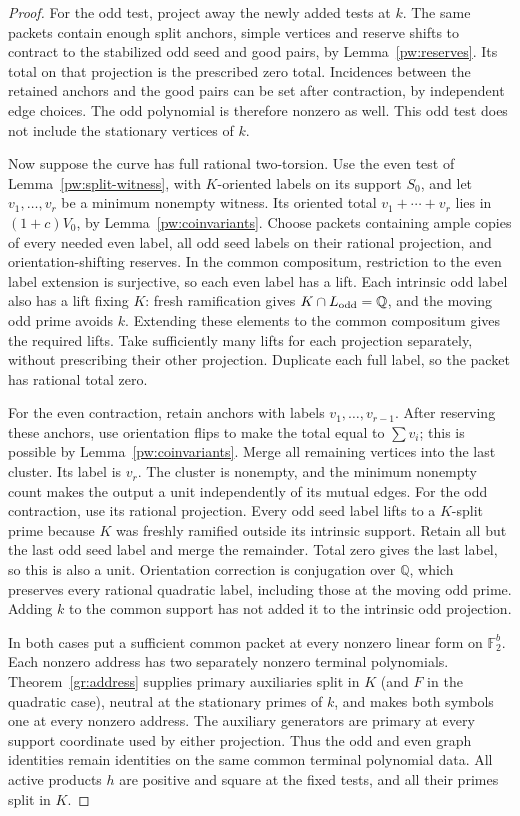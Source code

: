 \begin{proof}
For the odd test, project away the newly added tests at $k$.  The same
packets contain enough split anchors, simple vertices and reserve shifts
to contract to the stabilized odd seed and good pairs, by
Lemma~\ref{pw:reserves}.  Its total on that projection is the prescribed
zero total.  Incidences between the retained anchors and the good pairs
can be set after contraction, by independent edge choices.  The odd
polynomial is therefore nonzero as well.  This odd test does not include
the stationary vertices of $k$.

Now suppose the curve has full rational two-torsion.  Use the even test
of Lemma~\ref{pw:split-witness}, with $K$-oriented labels on its support
$S_0$, and let $v_1,\ldots,v_r$ be a minimum nonempty witness.  Its
oriented total $v_1+\cdots+v_r$ lies in $(1+c)V_0$, by
Lemma~\ref{pw:coinvariants}.  Choose packets containing ample copies of
every needed even label, all odd seed labels on their rational
projection, and orientation-shifting reserves.  In the common compositum,
restriction to the even label extension is surjective, so each even label
has a lift.  Each intrinsic odd label also has a lift fixing $K$: fresh
ramification gives $K\cap L_{\rm odd}=\mathbb Q$, and the moving odd prime
avoids $k$.  Extending these elements to the common compositum gives the
required lifts.  Take sufficiently many lifts for each projection
separately, without prescribing their other projection.  Duplicate each
full label, so the packet has rational total zero.

For the even contraction, retain anchors with labels
$v_1,\ldots,v_{r-1}$.  After reserving these anchors, use orientation
flips to make the total equal to $\sum v_i$; this is possible by
Lemma~\ref{pw:coinvariants}.  Merge all remaining vertices into the
last cluster.  Its label is $v_r$.  The cluster is nonempty, and the
minimum nonempty count makes the output a unit independently of its
mutual edges.  For the odd contraction, use its rational projection.
Every odd seed label lifts to a $K$-split prime because $K$ was freshly
ramified outside its intrinsic support.  Retain all but the last odd
seed label and merge the remainder.  Total zero gives the last label,
so this is also a unit.  Orientation correction is conjugation over
$\mathbb Q$, which preserves every rational quadratic label, including
those at the moving odd prime.  Adding $k$ to the common support has not
added it to the intrinsic odd projection.

In both cases put a sufficient common packet at every nonzero linear
form on $\mathbb F_2^b$.  Each nonzero address has two separately
nonzero terminal polynomials.  Theorem~\ref{gr:address} supplies primary
auxiliaries split in $K$ (and $F$ in the quadratic case), neutral at the
stationary primes of $k$, and makes both symbols one at every nonzero
address.  The auxiliary generators are primary at every support
coordinate used by either projection.  Thus the odd and even graph
identities remain identities on the same common terminal polynomial
data.  All active products $h$ are positive and square at the fixed
tests, and all their primes split in $K$.


\end{proof}
